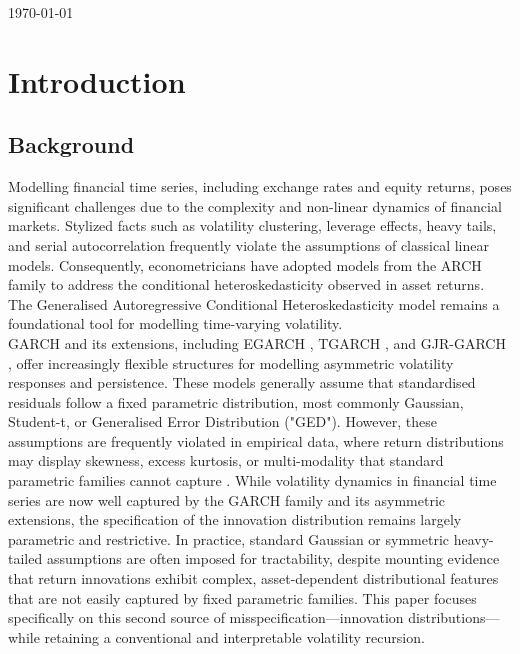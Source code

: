 \documentclass[oneside,12pt]{CUEDthesisPSnPDF}
\newcommand{\textcite}{\citet}
\newcommand{\parencite}{\citep}
\begin{document}
\noindent \today
\clearpage
\noindent \eject 
\noindent 


\chapter{Introduction}

\section{Background}
\noindent
Modelling financial time series, including exchange rates and equity returns, poses significant challenges due to the complexity and non-linear dynamics of financial markets. Stylized facts such as volatility clustering, leverage effects, heavy tails, and serial autocorrelation frequently violate the assumptions of classical linear models. Consequently, econometricians have adopted models from the ARCH family to address the conditional heteroskedasticity observed in asset returns. The Generalised Autoregressive Conditional Heteroskedasticity model remains a foundational tool for modelling time-varying volatility.\\

GARCH and its extensions, including EGARCH \parencite{nelson1991conditional}, TGARCH \parencite{zakoian1994threshold}, and GJR-GARCH \parencite{glosten1993relation}, offer increasingly flexible structures for modelling asymmetric volatility responses and persistence. These models generally assume that standardised residuals follow a fixed parametric distribution, most commonly Gaussian, Student-t, or Generalised Error Distribution ("GED"). However, these assumptions are frequently violated in empirical data, where return distributions may display skewness, excess kurtosis, or multi-modality that standard parametric families cannot capture \textcite{ederington2005forecasting}. While volatility dynamics in financial time series are now well captured by the GARCH family and its asymmetric extensions, the specification of the innovation distribution remains largely parametric and restrictive. In practice, standard Gaussian or symmetric heavy-tailed assumptions are often imposed for tractability, despite mounting evidence that return innovations exhibit complex, asset-dependent distributional features that are not easily captured by fixed parametric families. This paper focuses specifically on this second source of misspecification—innovation distributions—while retaining a conventional and interpretable volatility recursion.\\
\end{document}
